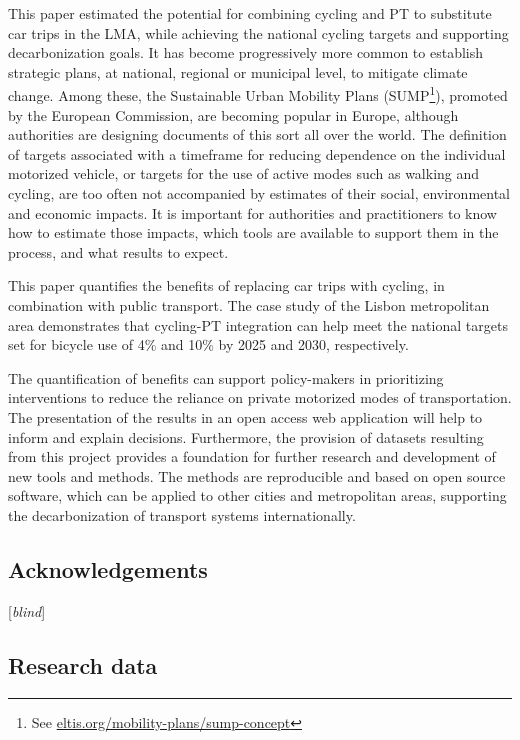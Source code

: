\documentclass[review, doubleblind, 3p,
authoryear]{elsarticle} %
\begin{document}
This paper estimated the potential for combining cycling and PT to
substitute car trips in the LMA, while achieving the national cycling
targets and supporting decarbonization goals. It has become
progressively more common to establish strategic plans, at national,
regional or municipal level, to mitigate climate change. Among these,
the Sustainable Urban Mobility Plans (SUMP\footnote{See
  \href{https://www.eltis.org/mobility-plans/sump-concept}{eltis.org/mobility-plans/sump-concept}}),
promoted by the European Commission, are becoming popular in Europe,
although authorities are designing documents of this sort all over the
world. The definition of targets associated with a timeframe for
reducing dependence on the individual motorized vehicle, or targets for
the use of active modes such as walking and cycling, are too often not
accompanied by estimates of their social, environmental and economic
impacts. It is important for authorities and practitioners to know how
to estimate those impacts, which tools are available to support them in
the process, and what results to expect.

This paper quantifies the benefits of replacing car trips with cycling,
in combination with public transport. The case study of the Lisbon
metropolitan area demonstrates that cycling-PT integration can help meet
the national targets set for bicycle use of 4\% and 10\% by 2025 and
2030, respectively.

The quantification of benefits can support policy-makers in prioritizing
interventions to reduce the reliance on private motorized modes of
transportation. The presentation of the results in an open access web
application will help to inform and explain decisions. Furthermore, the
provision of datasets resulting from this project provides a foundation
for further research and development of new tools and methods. The
methods are reproducible and based on open source software, which can be
applied to other cities and metropolitan areas, supporting the
decarbonization of transport systems internationally.

\hypertarget{acknowledgements}{%
\subsection*{Acknowledgements}\label{acknowledgements}}

{[}\emph{blind}{]}

\hypertarget{research-data}{%
\subsection*{Research data}\label{research-data}}
\end{document}
